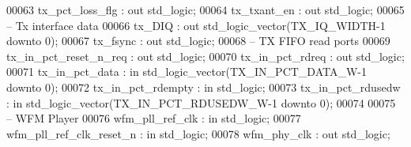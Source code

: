 \begin{DoxyCode}
00063       \textcolor{vhdlchar}{tx_pct_loss_flg}         \textcolor{vhdlchar}{:} \textcolor{keywordflow}{out}    \textcolor{comment}{std\_logic};
00064       \textcolor{vhdlchar}{tx_txant_en}             \textcolor{vhdlchar}{:} \textcolor{keywordflow}{out}    \textcolor{comment}{std\_logic};  
00065 \textcolor{keyword}{         -- Tx interface data }
00066       \textcolor{vhdlchar}{tx_DIQ}                  \textcolor{vhdlchar}{:} \textcolor{keywordflow}{out}    \textcolor{comment}{std\_logic\_vector}\textcolor{vhdlchar}{(}\textcolor{vhdlchar}{TX_IQ_WIDTH}\textcolor{vhdlchar}{-}\textcolor{vhdllogic}{}\textcolor{vhdllogic}{1} \textcolor{keywordflow}{downto} \textcolor{vhdllogic}{}\textcolor{vhdllogic}{0}\textcolor{vhdlchar}{)};
00067       \textcolor{vhdlchar}{tx_fsync}                \textcolor{vhdlchar}{:} \textcolor{keywordflow}{out}    \textcolor{comment}{std\_logic};
00068 \textcolor{keyword}{         -- TX FIFO read ports}
00069       \textcolor{vhdlchar}{tx_in_pct_reset_n_req}   \textcolor{vhdlchar}{:} \textcolor{keywordflow}{out}    \textcolor{comment}{std\_logic};
00070       \textcolor{vhdlchar}{tx_in_pct_rdreq}         \textcolor{vhdlchar}{:} \textcolor{keywordflow}{out}    \textcolor{comment}{std\_logic};
00071       \textcolor{vhdlchar}{tx_in_pct_data}          \textcolor{vhdlchar}{:} \textcolor{keywordflow}{in}     \textcolor{comment}{std\_logic\_vector}\textcolor{vhdlchar}{(}\textcolor{vhdlchar}{TX_IN_PCT_DATA_W}\textcolor{vhdlchar}{-}\textcolor{vhdllogic}{}\textcolor{vhdllogic}{1} \textcolor{keywordflow}{downto} \textcolor{vhdllogic}{}\textcolor{vhdllogic}{0}\textcolor{vhdlchar}{)};
00072       \textcolor{vhdlchar}{tx_in_pct_rdempty}       \textcolor{vhdlchar}{:} \textcolor{keywordflow}{in}     \textcolor{comment}{std\_logic};
00073       \textcolor{vhdlchar}{tx_in_pct_rdusedw}       \textcolor{vhdlchar}{:} \textcolor{keywordflow}{in}     \textcolor{comment}{std\_logic\_vector}\textcolor{vhdlchar}{(}\textcolor{vhdlchar}{TX_IN_PCT_RDUSEDW_W}\textcolor{vhdlchar}{-}\textcolor{vhdllogic}{}\textcolor{vhdllogic}{1} \textcolor{keywordflow}{downto} \textcolor{vhdllogic}{}\textcolor{vhdllogic}{0}\textcolor{vhdlchar}{)};
00074       
00075 \textcolor{keyword}{      -- WFM Player}
00076       \textcolor{vhdlchar}{wfm_pll_ref_clk}         \textcolor{vhdlchar}{:} \textcolor{keywordflow}{in}     \textcolor{comment}{std\_logic};
00077       \textcolor{vhdlchar}{wfm_pll_ref_clk_reset_n} \textcolor{vhdlchar}{:} \textcolor{keywordflow}{in}     \textcolor{comment}{std\_logic};
00078       \textcolor{vhdlchar}{wfm_phy_clk}             \textcolor{vhdlchar}{:} \textcolor{keywordflow}{out}    \textcolor{comment}{std\_logic};

\end{DoxyCode}
